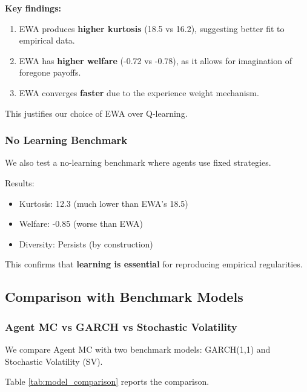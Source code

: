 \textbf{Key findings:}

\begin{enumerate}
    \item EWA produces \textbf{higher kurtosis} (18.5 vs 16.2), suggesting better fit to empirical data.
    
    \item EWA has \textbf{higher welfare} (-0.72 vs -0.78), as it allows for imagination of foregone payoffs.
    
    \item EWA converges \textbf{faster} due to the experience weight mechanism.
\end{enumerate}

This justifies our choice of EWA over Q-learning.

\subsubsection{No Learning Benchmark}

We also test a no-learning benchmark where agents use fixed strategies.

Results:
\begin{itemize}
    \item Kurtosis: 12.3 (much lower than EWA's 18.5)
    \item Welfare: -0.85 (worse than EWA)
    \item Diversity: Persists (by construction)
\end{itemize}

This confirms that \textbf{learning is essential} for reproducing empirical regularities.

\subsection{Comparison with Benchmark Models}

\subsubsection{Agent MC vs GARCH vs Stochastic Volatility}

We compare Agent MC with two benchmark models: GARCH(1,1) and Stochastic Volatility (SV).

Table \ref{tab:model_comparison} reports the comparison.

